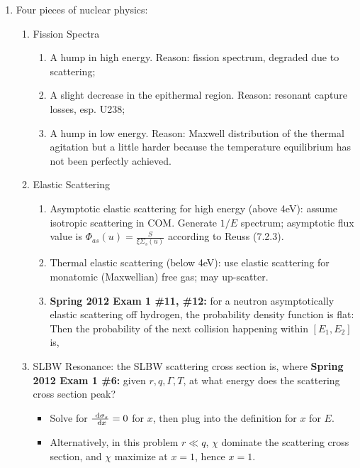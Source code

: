 \documentclass{school-22.211-notes}
\begin{document}
\clearpage
{}
\begin{enumerate}


\item Four pieces of nuclear physics: 
  \begin{enumerate}
    \item Fission Spectra    
      \begin{enumerate}
      \item A hump in high energy. Reason: fission spectrum, degraded due to scattering; 
      \item A slight decrease in the epithermal region. Reason: resonant capture losses, esp. U238; 
      \item A hump in low energy. Reason: Maxwell distribution of the thermal agitation but a little harder because the temperature equilibrium has not been perfectly achieved. 
      \end{enumerate}

    \item Elastic Scattering
      \begin{enumerate}
      \item Asymptotic elastic scattering for high energy (above 4eV): assume isotropic scattering in COM. Generate $1/E$ spectrum; asymptotic flux value is $\Phi_{as} (u) = \frac{S}{\xi \Sigma_s (u)}$ according to Reuss (7.2.3). 
      \item Thermal elastic scattering (below 4eV): use elastic scattering for monatomic (Maxwellian) free gas; may up-scatter. 
      \item  \textbf{Spring 2012 Exam 1 \#11, \#12:} for a neutron asymptotically elastic scattering off hydrogen, the probability density function is flat: 
        Then the probability of the next collision happening within $[E_1,E_2]$ is, 
      \end{enumerate}

    \item SLBW Resonance: the SLBW scattering cross section is, 
      where 
      \textbf{Spring 2012 Exam 1 \#6:} given $r,q, \Gamma,T$, at what energy does the scattering cross section peak? 
      \begin{itemize}
        \item Solve for $\frac{\mbox{ }\mathrm{d} \sigma_s}{\mbox{ }\mathrm{d} x} = 0$ for $x$, then plug into the definition for $x$ for $E$.
        \item Alternatively, in this problem $r \ll q$, $\chi$ dominate the scattering cross section, and $\chi$ maximize at $x=1$, hence $x=1$. 
      \end{itemize}


\end{enumerate}
\end{enumerate}
\end{document}
